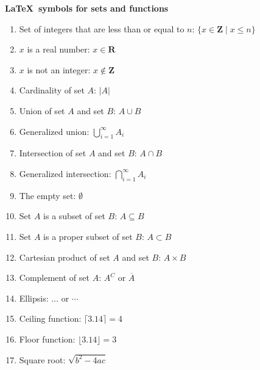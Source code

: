 \documentclass{article}
\theoremstyle{definition}
\newcommand{\R}{\mathbf{R}}
\newcommand{\Z}{\mathbf{Z}}
\begin{document}
\bigskip
\bigskip
\noindent
\textbf{\LaTeX\ symbols for sets and functions}
\smallskip
\begin{enumerate}
\item
Set of integers that are less than or equal to $n$: $\{x\in \Z\mid x \le n\}$
\item
$x$ is a real number: $x\in \R$
\item 
$x$ is not an integer: $x\not\in \Z$
\item 
Cardinality of set $A$: $|A|$
\item 
Union of set $A$ and set $B$: $A\cup B$
\item
Generalized union: $\bigcup_{i=1}^\infty A_i$
\item
Intersection of set $A$ and set $B$: $A\cap B$
\item 
Generalized intersection: $\bigcap_{i=1}^\infty A_i$
\item
The empty set: $\emptyset$
\item
Set $A$ is a subset of set $B$: $A\subseteq B$
\item
Set $A$ is a proper subset of set $B$: $A\subset B$
\item 
Cartesian product of set $A$ and set $B$: $A \times B$
\item 
Complement of set $A$: $A^C$ or $\overline{A}$
\item
Ellipsis: $\ldots$ or $\cdots$
\item
Ceiling function: $\lceil 3.14 \rceil = 4$
\item 
Floor function: $\lfloor 3.14 \rfloor = 3$
\item 
Square root: $\sqrt{b^2-4ac}$
\end{enumerate}
\end{document}
